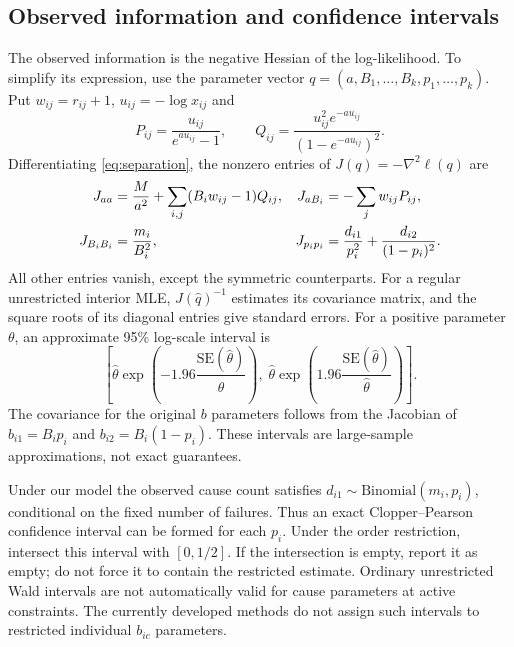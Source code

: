 \documentclass[a4paper,11pt]{article}
\begin{document}
\subsection{Observed information and confidence intervals}
The observed information is the negative Hessian of the log-likelihood. To simplify its expression, use the parameter vector $q=(a,B_1,\ldots,B_k,p_1,\ldots,p_k)$. Put $w_{ij}=r_{ij}+1$, $u_{ij}=-\log x_{ij}$ and
\begin{equation}\label{eq:PQ}
P_{ij}=\frac{u_{ij}}{e^{au_{ij}}-1},\qquad
Q_{ij}=\frac{u_{ij}^2e^{-au_{ij}}}{(1-e^{-au_{ij}})^2}.
\end{equation}
Differentiating \eqref{eq:separation}, the nonzero entries of $J(q)=-\nabla^2\ell(q)$ are
\begin{align}\label{eq:info}
J_{aa}&=\frac{M}{a^2}+\sum_{i,j}(B_iw_{ij}-1)Q_{ij}, &
J_{aB_i}&=-\sum_jw_{ij}P_{ij},\\\notag
J_{B_iB_i}&=\frac{m_i}{B_i^2}, &
J_{p_ip_i}&=\frac{d_{i1}}{p_i^2}+\frac{d_{i2}}{(1-p_i)^2}.
\end{align}
All other entries vanish, except the symmetric counterparts. For a regular unrestricted interior MLE, $J(\widehat q)^{-1}$ estimates its covariance matrix, and the square roots of its diagonal entries give standard errors. For a positive parameter $\theta$, an approximate 95\% log-scale interval is
\begin{equation}\label{eq:aci}
\left[\widehat\theta\exp\!\left(-1.96\frac{\mathrm{SE}(\widehat\theta)}{\widehat\theta}\right),\;
\widehat\theta\exp\!\left(1.96\frac{\mathrm{SE}(\widehat\theta)}{\widehat\theta}\right)\right].
\end{equation}
The covariance for the original $b$ parameters follows from the Jacobian of $b_{i1}=B_ip_i$ and $b_{i2}=B_i(1-p_i)$. These intervals are large-sample approximations, not exact guarantees.

Under our model the observed cause count satisfies $d_{i1}\sim\mathrm{Binomial}(m_i,p_i)$, conditional on the fixed number of failures. Thus an exact Clopper--Pearson confidence interval can be formed for each $p_i$. Under the order restriction, intersect this interval with $[0,1/2]$. If the intersection is empty, report it as empty; do not force it to contain the restricted estimate. Ordinary unrestricted Wald intervals are not automatically valid for cause parameters at active constraints. The currently developed methods do not assign such intervals to restricted individual $b_{ic}$ parameters.
\end{document}
